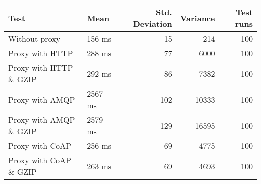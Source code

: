 \begin{tabularx}{\textwidth}{llrrr}
\hline
 Test                   & Mean    &   Std. Deviation &   Variance &   Test runs \\
\hline
 Without proxy          & 156 ms  &               15 &        214 &         100 \\
 Proxy with HTTP        & 288 ms  &               77 &       6000 &         100 \\
 Proxy with HTTP \& GZIP & 292 ms  &               86 &       7382 &         100 \\
 Proxy with AMQP        & 2567 ms &              102 &      10333 &         100 \\
 Proxy with AMQP \& GZIP & 2579 ms &              129 &      16595 &         100 \\
 Proxy with CoAP        & 256 ms  &               69 &       4775 &         100 \\
 Proxy with CoAP \& GZIP & 263 ms  &               69 &       4693 &         100 \\
\hline
\end{tabularx}